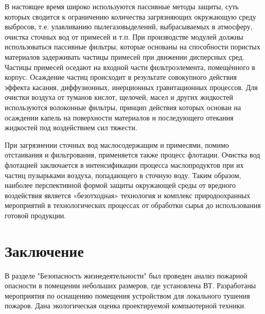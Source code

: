В настоящее время широко используются пассивные методы защиты, суть которых сводится к ограничению количества
загрязняющих окружающую среду выбросов, т.е. улавливанию пылегазовыделений, выбрасываемых в атмосферу, очистка
сточных вод от примесей и т.п. При производстве модулей должны использоваться пассивные фильтры, которые основаны
на способности пористых материалов задерживать частицы примесей при движении дисперсных сред. Частицы примесей оседают
на входной части фильтроэлемента, помещённого в корпус. Осаждение частиц происходит в результате совокупного действия
эффекта касания, диффузионных, инерционных гравитационных процессов. Для очистки воздуха от туманов кислот, щелочей,
масел и других жидкостей используются волоконные фильтры, принцип действия которых основан на осаждении капель на
поверхности материалов и последующего отекания жидкостей под воздействием сил тяжести.

При загрязнении сточных вод маслосодержащим и примесями, помимо отстаивания и фильтрования, применяется также
процесс флотации. Очистка вод флотацией заключается в интенсификации процесса маслопродуктов при их частиц
пузырьками воздуха, попадающего в сточную воду. Таким образом, наиболее перспективной формой защиты окружающей
среды от вредного воздействия является «безотходная» технология и комплекс природоохранных мероприятий в
технологических процессах от обработки сырья до использования готовой продукции.

\newpage

\section*{Заключение}
В разделе "Безопасность жизнедеятельности" был проведен анализ пожарной опасности в помещении небольших размеров,
где установлена ВТ. Разработаны мероприятия по оснащению помещения устройством для локального тушения пожаров. Дана
экологическая оценка проектируемой компьютерной техники.

\newpage
